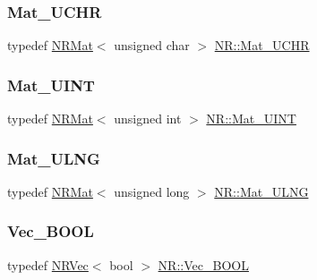 \mbox{\label{namespaceNR_a1752fb9659ce8f5ff7e61ac55d858073}} 
\subsubsection{\texorpdfstring{Mat\_UCHR}{Mat\_UCHR}}
{\footnotesize\ttfamily typedef \mbox{\hyperlink{classNR_1_1NRMat}{N\+R\+Mat}}$<$ unsigned char $>$ \mbox{\hyperlink{namespaceNR_a1752fb9659ce8f5ff7e61ac55d858073}{N\+R\+::\+Mat\+\_\+\+U\+C\+HR}}}

\mbox{\label{namespaceNR_a01f5d86042bd4919f04d9a7b6dec8c60}} 
\subsubsection{\texorpdfstring{Mat\_UINT}{Mat\_UINT}}
{\footnotesize\ttfamily typedef \mbox{\hyperlink{classNR_1_1NRMat}{N\+R\+Mat}}$<$ unsigned int $>$ \mbox{\hyperlink{namespaceNR_a01f5d86042bd4919f04d9a7b6dec8c60}{N\+R\+::\+Mat\+\_\+\+U\+I\+NT}}}

\mbox{\label{namespaceNR_a6eba03f3bb664e5dd9de82a8d03beb66}} 
\subsubsection{\texorpdfstring{Mat\_ULNG}{Mat\_ULNG}}
{\footnotesize\ttfamily typedef \mbox{\hyperlink{classNR_1_1NRMat}{N\+R\+Mat}}$<$ unsigned long $>$ \mbox{\hyperlink{namespaceNR_a6eba03f3bb664e5dd9de82a8d03beb66}{N\+R\+::\+Mat\+\_\+\+U\+L\+NG}}}

\mbox{\label{namespaceNR_a724646cb87fce7f489384b9a113515fd}} 
\subsubsection{\texorpdfstring{Vec\_BOOL}{Vec\_BOOL}}
{\footnotesize\ttfamily typedef \mbox{\hyperlink{classNR_1_1NRVec}{N\+R\+Vec}}$<$ bool $>$ \mbox{\hyperlink{namespaceNR_a724646cb87fce7f489384b9a113515fd}{N\+R\+::\+Vec\+\_\+\+B\+O\+OL}}}

\mbox{\label{namespaceNR_a8bdd7b71b3ea3283f23eed0cfabaf38c}} 
